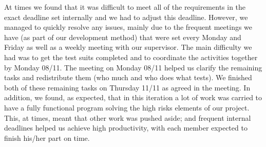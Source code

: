 At times we found that it was difficult to meet all of the requirements in the exact deadline set internally and we had to adjust this deadline. However, we managed to quickly resolve any issues, mainly due to the frequent meetings we have (as part of our development method) that were set every Monday and  Friday as well as a weekly meeting with our supervisor. The main difficulty we had was to get the test suits completed  and to coordinate the activities together by Monday 08/11. The meeting on Monday 08/11 helped us clarify the remaining tasks and redistribute them (who much and who does what tests). We finished both of these remaining tasks on Thursday 11/11 as agreed in the meeting. In addition, we found, as expected, that in this iteration a lot of work was carried to have a fully functional program solving the high risks elements of our project. This, at times, meant that other work was pushed aside; and frequent internal deadlines helped us achieve high productivity, with each member expected to finish his/her part on time. 

